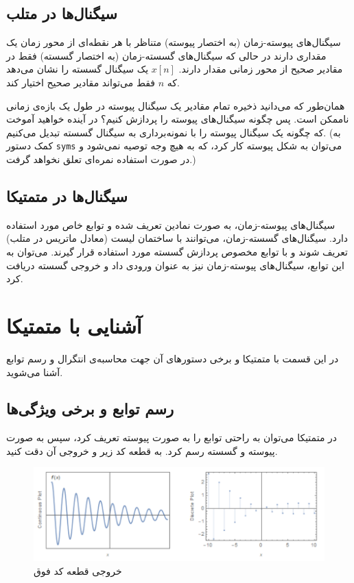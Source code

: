 \documentclass{utsignal}
\begin{document}
	\subsection{سیگنال‌ها در متلب}
	سیگنال‌های پیوسته-زمان  (به اختصار پیوسته) متناظر با هر نقطه‌ای از محور زمان یک مقداری دارند در حالی که سیگنال‌‌های گسسته-زمان (به اختصار گسسته) فقط در مقادیر صحیح از محور زمانی مقدار دارند. $x[n]$ یک سیگنال گسسته را نشان می‌دهد که $n$ فقط می‌تواند مقادیر صحیح اختیار کند.
	
	همان‌طور که می‌دانید ذخیره تمام مقادیر یک سیگنال پیوسته در طول یک بازه‌ی زمانی ناممکن است. پس چگونه سیگنال‌های پیوسته را پردازش کنیم؟ در آینده خواهید آموخت که چگونه یک سیگنال پیوسته را با نمونه‌برداری به سیگنال گسسته تبدیل می‌کنیم. (به کمک دستور \lstinline[language=Octave]{syms} می‌توان به شکل پیوسته کار کرد، که به هیچ وجه توصیه نمی‌شود و در صورت استفاده نمره‌ای تعلق نخواهد گرفت.)

	\subsection{سیگنال‌ها در متمتیکا}
	سیگنال‌های پیوسته-زمان، به صورت نمادین تعریف شده و توابع خاص مورد استفاده دارد. سیگنال‌های گسسته-زمان، می‌توانند با ساختمان لیست  (معادل ماتریس در متلب) تعریف شوند و با توابع مخصوص پردازش گسسته مورد استفاده قرار گیرند. می‌توان به این توابع، سیگنال‌های پیوسته-زمان نیز به عنوان ورودی داد و خروجی گسسته دریافت کرد.
	\section{آشنایی با متمتیکا}
	در این قسمت با متمتیکا و برخی دستورهای آن جهت محاسبه‌ی انتگرال و رسم توابع آشنا می‌شوید.
	\subsection{رسم توابع و برخی ویژگی‌ها}
	در متمتیکا می‌توان به راحتی توابع را به صورت پیوسته تعریف کرد، سپس به صورت پیوسته و گسسته رسم کرد. به قطعه کد زیر و خروجی آن دقت کنید.
	\begin{latin}
		
	\end{latin}
	
	\begin{figure}[h]
		\centering
		\includegraphics[height=0.2\textheight,keepaspectratio]{mathplot.png}
		\caption{خروجی قطعه کد فوق}
	\end{figure}
	
\end{document}
